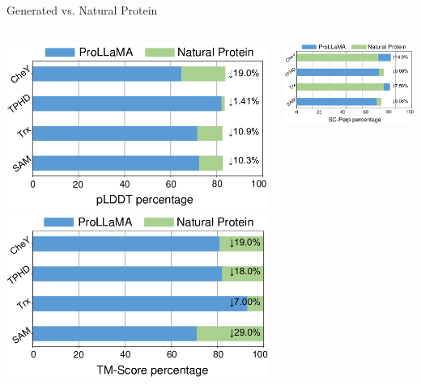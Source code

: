 \documentclass[dvipsnames,
hyperref={
	citecolor=blue,
	colorlinks=true,
	urlcolor=blue,
	linkcolor=,
}
]{beamer}
\begin{document}
\begin{frame}{Generated vs. Natural Protein}
	\begin{columns}
		\begin{column}{0.5\textwidth}
			\includegraphics[scale=0.7]{images/d.png}
			\includegraphics[scale=0.7]{images/f.png}
		\end{column}
		\begin{column}{0.5\textwidth}
			\includegraphics[scale=0.7]{images/e.png}

\end{column}
\end{columns}
\end{frame}
\end{document}
